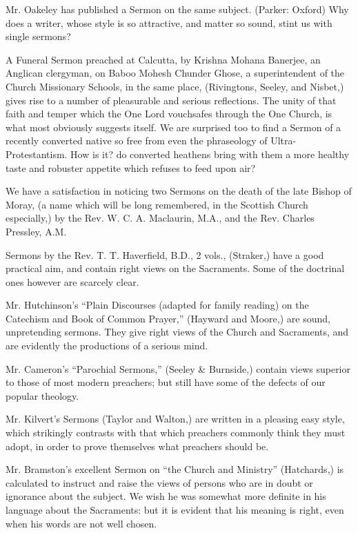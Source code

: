 Mr. Oakeley has published a Sermon on the same
subject. (Parker: Oxford) Why does a writer, whose style is so
attractive, and matter so sound, stint us with single sermons?

A Funeral Sermon preached at Calcutta, by Krishna
Mohana Banerjee, an Anglican clergyman, on Baboo Mohesh Chunder Ghose, a
superintendent of the Church Missionary Schools, in the same place, (Rivingtons,
Seeley, and Nisbet,) gives rise to a number of pleasurable and serious
reflections. The unity of that faith and temper which the One Lord
vouchsafes through the One Church, is what most obviously suggests
itself. We are surprised too to find a Sermon of a recently converted
native so free from even the phraseology of Ultra-Protestantism. How is
it? do converted heathens bring with them a more healthy taste and
robuster appetite which refuses to feed upon air?

We have a satisfaction in noticing two Sermons on
the death of the late Bishop of Moray, (a name which will be long
remembered, in the Scottish Church especially,) by the Rev. W. C. A.
Maclaurin, M.A., and the Rev. Charles Pressley, A.M.

Sermons by the Rev. T. T. Haverfield, B.D., 2
vols., (Straker,) have a good practical aim, and contain right views on
the Sacraments. Some of the doctrinal ones however are scarcely clear.

Mr. Hutchinson's ``Plain Discourses (adapted for
family reading) on the Catechism and Book of Common Prayer,'' (Hayward
and Moore,) are sound, unpretending sermons. They give right views of
the Church and Sacraments, and are evidently the productions of a
serious mind.

Mr. Cameron's ``Parochial Sermons,'' (Seeley \&
Burnside,) contain views superior to those of most modern preachers; but
still have some of the defects of our popular theology.

Mr. Kilvert's Sermons (Taylor and Walton,) are
written in a pleasing easy style, which strikingly contrasts with that
which preachers commonly think they must adopt, in order to prove
themselves what preachers should be.

Mr. Bramston's excellent Sermon on ``the Church and
Ministry'' (Hatchards,) is calculated to instruct and raise the views of
persons who are in doubt or ignorance about the subject. We wish he was
somewhat more definite in his language about the Sacraments: but it is
evident that his meaning is right, even when his words are not well
chosen.

